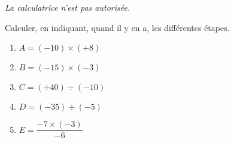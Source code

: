 \begin{minipage}{0.99\linewidth}

\exo

\emph{La calculatrice n'est pas autorisée.}


Calculer, en indiquant, quand il y en a, les différentes étapes. 
\begin{enumerate}

\item $ A = (-10) \times (+8) $

\item $ B = (-15) \times (-3) $

\item $ C = (+40) \div (-10) $

\item $ D = (-35) \div (-5) $

\item $ E = \dfrac{-7 \times (-3)}{-6} $


\end{enumerate}

\end{minipage}

\vspace{0.5cm}
